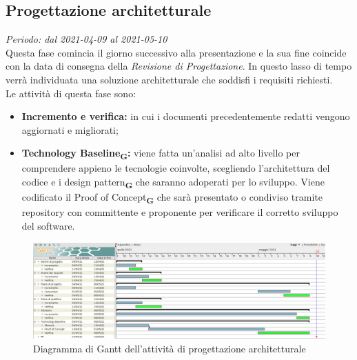     \subsection{Progettazione architetturale}
        \textit{Periodo: dal 2021-04-09 al 2021-05-10}\\
        Questa fase comincia il giorno successivo alla presentazione e la sua fine coincide con la data di consegna della \textit{Revisione di Progettazione}. In questo lasso di tempo verrà individuata una soluzione architetturale che soddisfi i requisiti richiesti.\\
        Le attività di questa fase sono:
        \begin {itemize}
            \item \textbf{Incremento e verifica:} in cui i documenti precedentemente redatti vengono aggiornati e migliorati;
            \item \textbf{Technology Baseline\textsubscript{\textbf{G}}:} viene fatta un’analisi ad alto livello per comprendere appieno le tecnologie coinvolte, scegliendo l’architettura del codice e i design pattern\textsubscript{\textbf{G}} che saranno adoperati per lo sviluppo. Viene codificato il Proof of Concept\textsubscript{\textbf{G}} che sarà presentato o condiviso tramite repository con committente e proponente per verificare il corretto sviluppo del software.
        \end {itemize}
        \begin{figure}[!ht]
            \caption{Diagramma di Gantt dell’attività di progettazione architetturale}
            \vspace{5px}
            \includegraphics[scale=0.3]{../../../Images/Diagrammi/Gantt/progettArchitetturale.png}
            \centering
        \end{figure}

